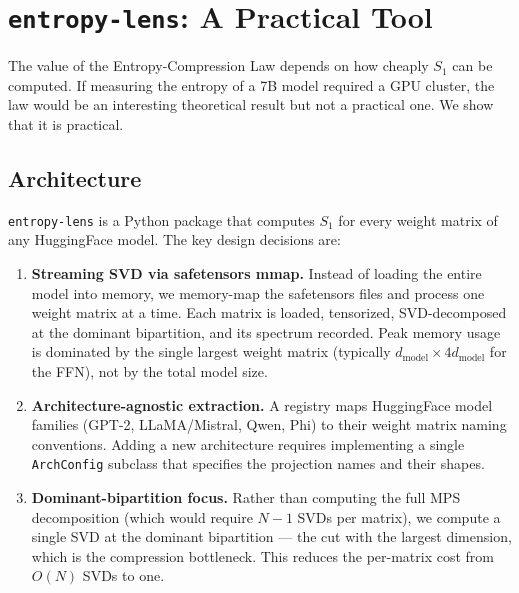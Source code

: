 \documentclass[11pt,a4paper]{article}
\newcommand{\Svn}{S_1}
\begin{document}
\section{\texttt{entropy-lens}: A Practical Tool}
\label{sec:tool}

The value of the Entropy-Compression Law depends on how cheaply
$\Svn$ can be computed.  If measuring the entropy of a 7B model
required a GPU cluster, the law would be an interesting theoretical
result but not a practical one.  We show that it is practical.

\subsection{Architecture}
\label{sec:tool-arch}

\texttt{entropy-lens} is a Python package that computes $\Svn$ for
every weight matrix of any HuggingFace model.  The key design
decisions are:

\begin{enumerate}[leftmargin=2em, itemsep=3pt]
  \item \textbf{Streaming SVD via safetensors mmap.}
    Instead of loading the entire model into memory, we memory-map
    the safetensors files and process one weight matrix at a time.
    Each matrix is loaded, tensorized, SVD-decomposed at the dominant
    bipartition, and its spectrum recorded.  Peak memory usage is
    dominated by the single largest weight matrix (typically
    $d_{\text{model}} \times 4 d_{\text{model}}$ for the FFN),
    not by the total model size.

  \item \textbf{Architecture-agnostic extraction.}
    A registry maps HuggingFace model families (GPT-2, LLaMA/Mistral,
    Qwen, Phi) to their weight matrix naming conventions.  Adding a
    new architecture requires implementing a single
    \texttt{ArchConfig} subclass that specifies the projection names
    and their shapes.

  \item \textbf{Dominant-bipartition focus.}
    Rather than computing the full MPS decomposition (which would
    require $N-1$ SVDs per matrix), we compute a single SVD at the
    dominant bipartition --- the cut with the largest dimension,
    which is the compression bottleneck.  This reduces the per-matrix
    cost from $O(N)$ SVDs to one.
\end{enumerate}
\end{document}
